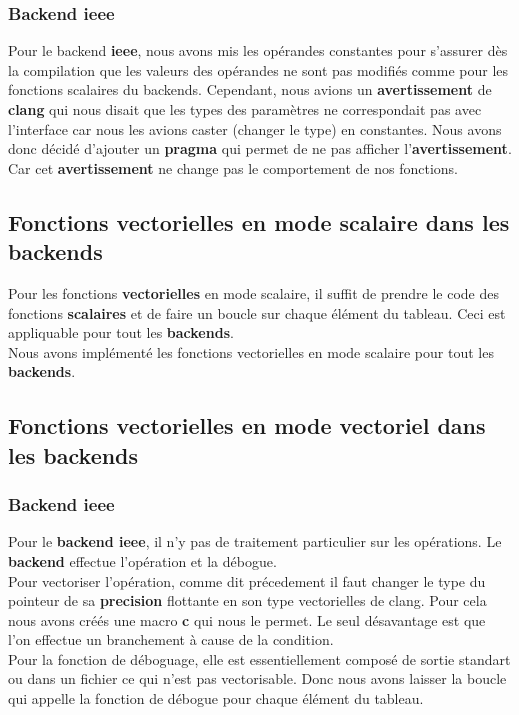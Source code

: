 \documentclass[11pt]{article}
\begin{document}
\subsubsection{Backend ieee}
\label{sec:org7f43e86}

Pour le backend \textbf{ieee}, nous avons mis les opérandes constantes pour
s'assurer dès la compilation que les valeurs des opérandes ne sont pas
modifiés comme pour les fonctions scalaires du backends. Cependant, nous
avions un \textbf{avertissement} de \textbf{clang} qui nous disait que les types des paramètres
ne correspondait pas avec l'interface car nous les avions caster (changer le
type) en constantes. Nous avons donc décidé d'ajouter un \textbf{pragma} qui permet
de ne pas afficher l'\textbf{avertissement}. Car cet \textbf{avertissement} ne change pas
le comportement de nos fonctions.

\subsection{Fonctions vectorielles en mode scalaire dans les backends}
\label{sec:org97d2039}

Pour les fonctions \textbf{vectorielles} en mode scalaire, il suffit de
prendre le code des fonctions \textbf{scalaires} et de faire un boucle sur
chaque élément du tableau. Ceci est appliquable pour tout les
\textbf{backends}.
\\ \vspace{5mm}
Nous avons implémenté les fonctions vectorielles en mode scalaire pour tout
les \textbf{backends}.

\subsection{Fonctions vectorielles en mode vectoriel dans les backends}
\label{sec:orge8c5987}
\subsubsection{Backend ieee}
\label{sec:orgdcba833}

Pour le \textbf{backend ieee}, il n'y pas de traitement particulier sur
les opérations. Le \textbf{backend} effectue l'opération et la débogue.
\\ \vspace{5mm}
Pour vectoriser l'opération, comme dit précedement il faut changer le type
du pointeur de sa \textbf{precision} flottante en son type vectorielles de
clang. Pour cela nous avons créés une macro \textbf{c} qui nous le
permet. Le seul désavantage est que l'on effectue un branchement à
cause de la condition.
\\ \vspace{5mm}
Pour la fonction de déboguage, elle est essentiellement composé de
sortie standart ou dans un fichier ce qui n'est pas
vectorisable. Donc nous avons laisser la boucle qui appelle la
fonction de débogue pour chaque élément du tableau.
\end{document}
